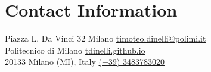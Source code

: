 \section{\sc Contact Information}
Piazza L. Da Vinci 32 Milano \hfill \href{mailto:timoteo.dinelli@polimi.it}{timoteo.dinelli@polimi.it}\\
Politecnico di Milano   \hfill \href{https://tdinelli.github.io}{tdinelli.github.io}\\
20133 Milano (MI), Italy  \hfill \href{tel:+39 3483783020}{(+39) 3483783020}\\
